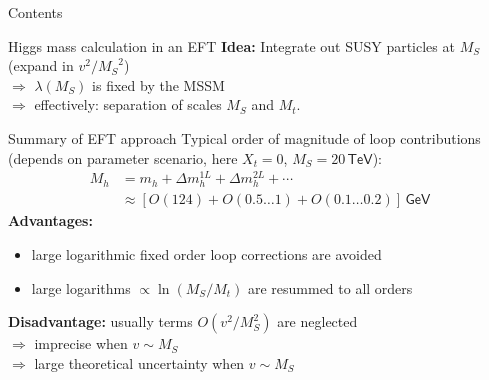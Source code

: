 \documentclass[hyperref={pdfpagelabels=false},ngerman]{beamer}
\newcommand{\eh}[1]{\,\mathsf{#1}}
\newcommand{\MS}{\ensuremath{M_S}}
\renewcommand{\emph}{\textbf}
\newcommand{\SM}{\ensuremath{\text{SM}}}
\begin{document}
\begin{frame}{Contents}
  \tableofcontents[
  currentsection,
  currentsubsection,
  subsectionstyle=show/shaded/hide]  
\end{frame}

\begin{frame}{Higgs mass calculation in an EFT}
  \emph{Idea:} Integrate out SUSY particles at $\MS$ (expand in $v^2/\MS^2$) \\
  $\Rightarrow$ $\lambda(\MS)$ is fixed by the MSSM \\
  $\Rightarrow$ effectively: separation of scales $\MS$ and $M_t$.
  \begin{center}
  \end{center}
\end{frame}

\begin{frame}{Summary of EFT approach}
  Typical order of magnitude of loop contributions (depends on
  parameter scenario, here $X_t = 0$, $\MS = 20\eh{TeV}$):
  \begin{align*}
    M_h &= m_h + \Delta m_h^{1L} + \Delta m_h^{2L} + \cdots \\
    &\approx [O(124) + O(0.5\ldots 1) + O(0.1\ldots 0.2)] \eh{GeV}
  \end{align*}
  \emph{Advantages:}
  \begin{itemize}
  \item large logarithmic fixed order loop corrections are avoided
  \item large logarithms $\propto\ln(M_S/M_t)$ are resummed to all orders
  \end{itemize}
  \emph{Disadvantage:} usually terms $O(v^2/M_S^2)$ are neglected \\
  $\Rightarrow$ imprecise when $v \sim \MS$ \\
  $\Rightarrow$ large theoretical uncertainty when $v \sim \MS$
\end{frame}
\end{document}

